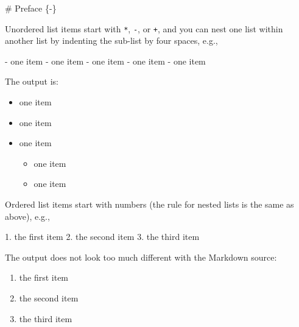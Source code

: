\documentclass[
  12pt,
]{krantz}
\newenvironment{Shaded}{\begin{snugshade}}{\end{snugshade}}
\newcommand{\FunctionTok}[1]{\textcolor[rgb]{0.00,0.00,0.00}{#1}}
\newcommand{\NormalTok}[1]{#1}
\newcommand{\SpecialStringTok}[1]{\textcolor[rgb]{0.31,0.60,0.02}{#1}}
\providecommand{\tightlist}{%
  \setlength{\itemsep}{0pt}\setlength{\parskip}{0pt}}
\theoremstyle{definition}
\theoremstyle{definition}
\theoremstyle{definition}
\theoremstyle{definition}
\theoremstyle{remark}
\begin{document}
\begin{Shaded}
\begin{Highlighting}[]
\FunctionTok{\# Preface \{{-}\}}
\end{Highlighting}
\end{Shaded}

Unordered list items start with \texttt{*}, \texttt{-}, or \texttt{+}, and you can nest one list within another list by indenting the sub-list by four spaces, e.g.,

\begin{Shaded}
\begin{Highlighting}[]
\SpecialStringTok{{-} }\NormalTok{one item}
\SpecialStringTok{{-} }\NormalTok{one item}
\SpecialStringTok{{-} }\NormalTok{one item}
\SpecialStringTok{    {-} }\NormalTok{one item}
\SpecialStringTok{    {-} }\NormalTok{one item}
\end{Highlighting}
\end{Shaded}

The output is:

\begin{itemize}
\tightlist
\item
  one item
\item
  one item
\item
  one item

  \begin{itemize}
  \tightlist
  \item
    one item
  \item
    one item
  \end{itemize}
\end{itemize}

Ordered list items start with numbers (the rule for nested lists is the same as above), e.g.,

\begin{Shaded}
\begin{Highlighting}[]
\SpecialStringTok{1. }\NormalTok{the first item}
\SpecialStringTok{2. }\NormalTok{the second item}
\SpecialStringTok{3. }\NormalTok{the third item}
\end{Highlighting}
\end{Shaded}

The output does not look too much different with the Markdown source:

\begin{enumerate}
\def\labelenumi{\arabic{enumi}.}
\tightlist
\item
  the first item
\item
  the second item
\item
  the third item
\end{enumerate}
\end{document}
